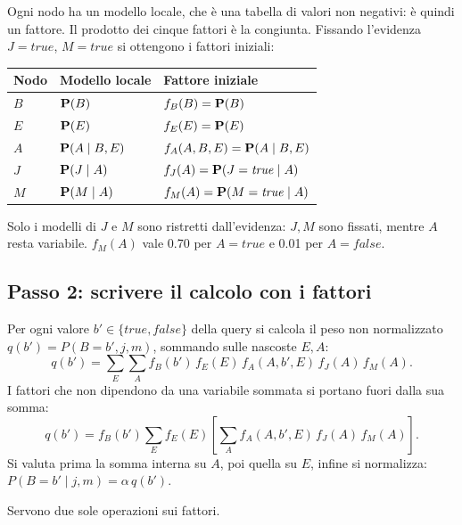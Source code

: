 Ogni nodo ha un modello locale, che è una tabella di valori non negativi: è
quindi un fattore. Il prodotto dei cinque fattori è la congiunta. Fissando
l'evidenza $J=\mathit{true}$, $M=\mathit{true}$ si ottengono i fattori iniziali:
\begin{center}
\begin{tabular}{lll}
  \toprule
  Nodo & Modello locale & Fattore iniziale \\ \midrule
  $B$ & $\mathbf{P}(B)$ & $f_B(B)=\mathbf{P}(B)$ \\
  $E$ & $\mathbf{P}(E)$ & $f_E(E)=\mathbf{P}(E)$ \\
  $A$ & $\mathbf{P}(A\mid B,E)$ & $f_A(A,B,E)=\mathbf{P}(A\mid B,E)$ \\
  $J$ & $\mathbf{P}(J\mid A)$ & $f_J(A)=\mathbf{P}(J=\mathit{true}\mid A)$ \\
  $M$ & $\mathbf{P}(M\mid A)$ & $f_M(A)=\mathbf{P}(M=\mathit{true}\mid A)$ \\ \bottomrule
\end{tabular}
\end{center}
Solo i modelli di $J$ e $M$ sono ristretti dall'evidenza: $J,M$ sono fissati,
mentre $A$ resta variabile. $f_M(A)$ vale 0.70 per $A=\mathit{true}$ e 0.01 per
$A=\mathit{false}$.

\subsection{Passo 2: scrivere il calcolo con i fattori}

Per ogni valore $b'\in\{\mathit{true},\mathit{false}\}$ della query si calcola il
peso non normalizzato $q(b')=P(B=b',j,m)$, sommando sulle nascoste $E,A$:
\[
  q(b') = \sum_E\sum_A f_B(b')\,f_E(E)\,f_A(A,b',E)\,f_J(A)\,f_M(A).
\]
I fattori che non dipendono da una variabile sommata si portano fuori dalla
sua somma:
\[
  q(b') = f_B(b')\sum_E f_E(E)\left[\sum_A f_A(A,b',E)\,f_J(A)\,f_M(A)\right].
\]
Si valuta prima la somma interna su $A$, poi quella su $E$, infine si normalizza:
$P(B=b'\mid j,m) = \alpha\,q(b')$.

Servono due sole operazioni sui fattori.


